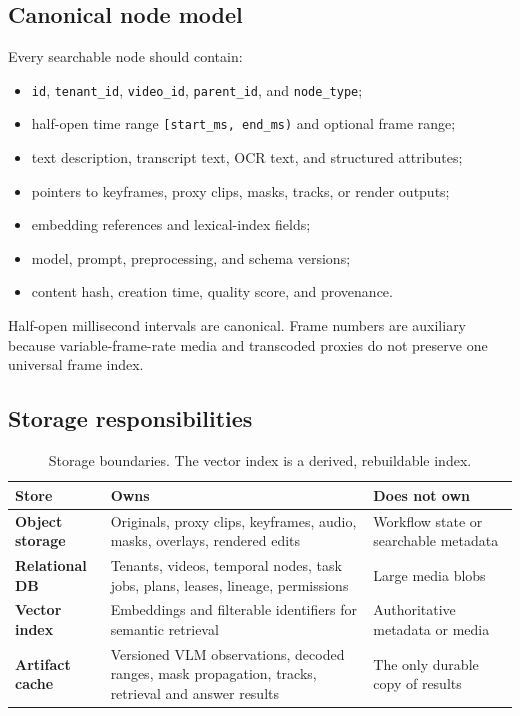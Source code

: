 \documentclass[11pt]{article}
\newcommand{\code}[1]{\texttt{#1}}
\begin{document}
\subsection{Canonical node model}

Every searchable node should contain:

\begin{itemize}
  \item \code{id}, \code{tenant\_id}, \code{video\_id}, \code{parent\_id}, and
  \code{node\_type};
  \item half-open time range \code{[start\_ms, end\_ms)} and optional frame range;
  \item text description, transcript text, OCR text, and structured attributes;
  \item pointers to keyframes, proxy clips, masks, tracks, or render outputs;
  \item embedding references and lexical-index fields;
  \item model, prompt, preprocessing, and schema versions;
  \item content hash, creation time, quality score, and provenance.
\end{itemize}

Half-open millisecond intervals are canonical. Frame numbers are auxiliary
because variable-frame-rate media and transcoded proxies do not preserve one
universal frame index.

\subsection{Storage responsibilities}

\begin{table}[ht]
\centering
\begin{tabularx}{\textwidth}{>{\bfseries}p{28mm} X X}
\toprule
Store & Owns & Does not own \\
\midrule
Object storage & Originals, proxy clips, keyframes, audio, masks, overlays,
rendered edits & Workflow state or searchable metadata \\
Relational DB & Tenants, videos, temporal nodes, task jobs, plans, leases,
lineage, permissions & Large media blobs \\
Vector index & Embeddings and filterable identifiers for semantic retrieval &
Authoritative metadata or media \\
Artifact cache & Versioned VLM observations, decoded ranges, mask propagation,
tracks, retrieval and answer results & The only durable copy of results \\
\bottomrule
\end{tabularx}
\caption{Storage boundaries. The vector index is a derived, rebuildable index.}
\end{table}
\end{document}
